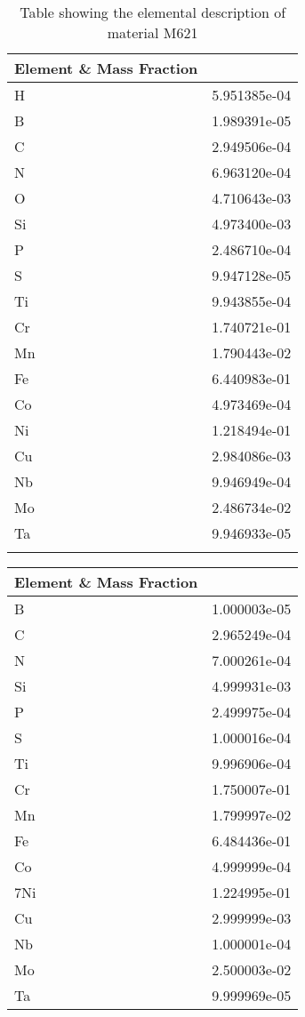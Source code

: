 \begin{centering}
\begin{longtable}[ht!]
  { p{} | p{} }
\hline
Element \& Mass Fraction\\
\hline
H &  5.951385e-04\\
B &  1.989391e-05\\
C &  2.949506e-04\\
N &  6.963120e-04\\
O &  4.710643e-03\\
Si &  4.973400e-03\\
P &  2.486710e-04\\
S &  9.947128e-05\\
Ti &  9.943855e-04\\
Cr &  1.740721e-01\\
Mn &  1.790443e-02\\
Fe &  6.440983e-01\\
Co &  4.973469e-04\\
Ni &  1.218494e-01\\
Cu &  2.984086e-03\\
Nb &  9.946949e-04\\
Mo &  2.486734e-02\\
Ta &  9.946933e-05\\

\caption{Table showing the elemental description of material M621}
\label{table:material_M621}
\end{longtable}
\clearpage

\begin{longtable}[ht!]
  { p{} | p{} }
\hline
Element \& Mass Fraction\\
\hline
B &  1.000003e-05\\
C &  2.965249e-04\\
N &  7.000261e-04\\
Si &  4.999931e-03\\
P &  2.499975e-04\\
S &  1.000016e-04\\
Ti &  9.996906e-04\\
Cr &  1.750007e-01\\
Mn &  1.799997e-02\\
Fe &  6.484436e-01\\
Co &  4.999999e-04\\
7Ni &  1.224995e-01\\
Cu &  2.999999e-03\\
Nb &  1.000001e-04\\
Mo &  2.500003e-02\\
Ta &  9.999969e-05\\


\end{longtable}
\end{centering}
